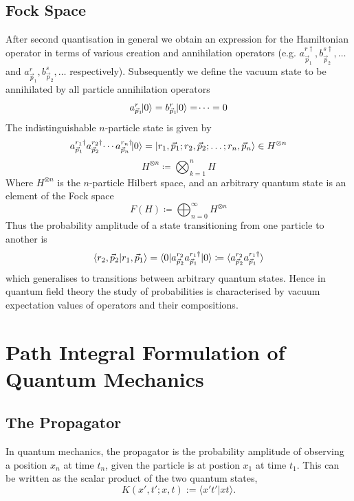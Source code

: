 \documentclass[11pt, a4paper]{article}
\theoremstyle{definition}
\theoremstyle{plain}
\begin{document}
\subsection{Fock Space}
After second quantisation in general we obtain an expression for the Hamiltonian operator
in terms of various creation and annihilation operators (e.g. $a^{r\dagger}_{\vec{p}_1},
b^{s\dagger}_{\vec{p}_2}, \dots$ and $a^{r}_{\vec{p}_1}, b^{s}_{\vec{p}_2}, \dots$ 
respectively). Subsequently we define the vacuum state to be annihilated by
all particle annihilation operators
\begin{equation}
  {a^{r}_{\vec{p}_1}}\!\!\ket{0} = b^{r}_{\vec{p}_1}\!\!\ket{0} = \dotsi = 0
\end{equation}
The indistinguishable $n$-particle state is given by 
\begin{equation}
  a^{r_1\dagger}_{\vec{p}_1}a^{r_2\dagger}_{\vec{p}_2}\dotsi
  a^{r_n\dagger}_{\vec{p}_n}\!\!\ket{0} =
  \ket{r_1, \vec{p}_1; r_2, \vec{p}_2; \dots; r_n, \vec{p}_n} \in H^{\otimes n}
\end{equation}
\begin{equation}
  H^{\otimes n} \coloneq \bigotimes_{k=1}^{n}{H}
\end{equation}
Where $H^{\otimes n}$ is the $n$-particle Hilbert space, and an arbitrary
quantum state is an element of the Fock space
\begin{equation}
  F(H) \coloneq \bigoplus_{n=0}^{\infty}{H^{\otimes n}}
\end{equation}
Thus the probability amplitude of a state transitioning from one particle to 
another is
\begin{equation}
  \braket{r_2, \vec{p}_2|r_1, \vec{p}_1} =
  \braket{0|a^{r_2}_{\vec{p}_2}a^{r_1\dagger}_{\vec{p}_1}|0} \coloneq 
  \braket{a^{r_2}_{\vec{p}_2}a^{r_1\dagger}_{\vec{p}_1}}
\end{equation}
which generalises to transitions between arbitrary quantum states.
Hence in quantum field theory the study of probabilities is
characterised by vacuum expectation values of operators and their compositions.

\newpage

\section{Path Integral Formulation of Quantum Mechanics}

\subsection{The Propagator}
In quantum mechanics, the propagator is the probability 
amplitude of observing a position $x_n$ at time $t_n$, given 
the particle is at postion $x_1$ at time $t_1$. This can be 
written as the scalar product of the two quantum states,
\begin{equation} 
K(x',t';x,t) := \langle x't'|xt \rangle .
\label{propagator}
\end{equation}
\end{document}
